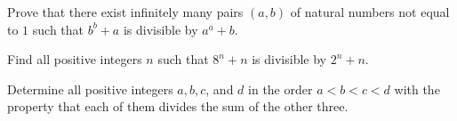 \begin{problem}
	Prove that there exist infinitely many pairs $ (a, b)$ of natural numbers not equal to $ 1$ such that $ b^b + a$ is divisible by $ a^a + b$.
\end{problem}


\begin{problem}
	Find all positive integers $n$ such that $8^n + n$ is divisible by $2^n + n$.  %
\end{problem}

%

\begin{problem}
	Determine all positive integers $a,b,c$, and $d$ in the order $a<b<c<d$ with the property that each of them divides the sum of the other three. %
\end{problem}

